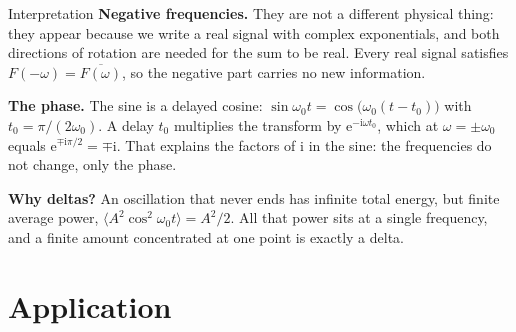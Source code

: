 \documentclass[11pt,aspectratio=169]{beamer}
\newcommand{\ii}{\mathrm{i}}
\newcommand{\e}{\mathrm{e}}
\begin{document}
\begin{frame}{Interpretation}
  \textbf{Negative frequencies.} They are not a different physical thing: they appear because
  we write a real signal with complex exponentials, and both directions of rotation are needed
  for the sum to be real. Every real signal satisfies $F(-\omega)=\overline{F(\omega)}$,
  so the negative part carries no new information.

  \vspace{3mm}
  \textbf{The phase.} The sine is a delayed cosine: $\sin\omega_0 t=\cos\big(\omega_0(t-t_0)\big)$
  with $t_0=\pi/(2\omega_0)$. A delay $t_0$ multiplies the transform by
  $\e^{-\ii\omega t_0}$, which at $\omega=\pm\omega_0$ equals $\e^{\mp\ii\pi/2}=\mp\ii$.
  That explains the factors of $\ii$ in the sine: the frequencies do not change, only the phase.

  \vspace{3mm}
  \textbf{Why deltas?} An oscillation that never ends has infinite total energy,
  but finite average power, $\langle A^2\cos^2\omega_0 t\rangle=A^2/2$. All that power
  sits at a single frequency, and a finite amount concentrated at one point is exactly
  a delta.
\end{frame}

\section{Application}
\end{document}
